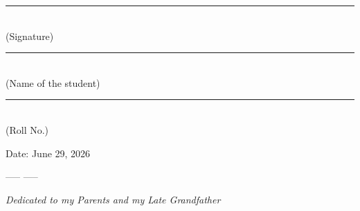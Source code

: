\documentclass[12pt,oneside]{book}
\newcommand{\dedicatory}[1]{%
    \clearpage
    \thispagestyle{empty}
    \vspace*{3cm}
    \begin{center}
        \textit{\large{#1}}
    \end{center}
    \clearpage
}
\begin{document}
\vspace{1.5cm}
\noindent\rule{8cm}{0.4pt}\\[1mm]
(Signature)

\vspace{0.5cm}
\noindent\rule{8cm}{0.4pt}\\[1mm]
(Name of the student)

\vspace{0.5cm}
\noindent\rule{8cm}{0.4pt}\\[1mm]
(Roll No.)

\vspace{0.5cm}
\noindent Date: June 29, 2026


\clearpage

\begin{center}
----- \floweroneleft\floweroneright -----
\end{center}


\dedicatory{Dedicated to my Parents and my Late Grandfather}


\clearpage



\tableofcontents
\listoffigures
\listoftables





\mainmatter












\end{document}
